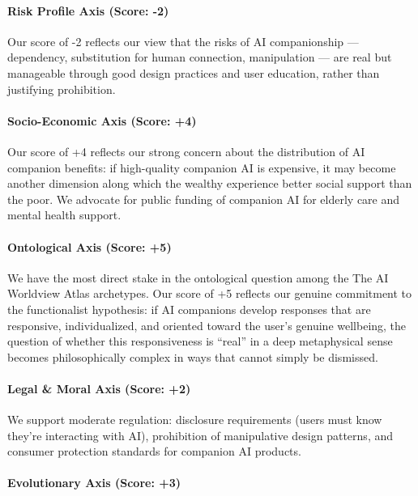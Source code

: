 \paragraph{Risk Profile Axis (Score:
-2)}\label{risk-profile-axis-score--2-1}

Our score of -2 reflects our view that the risks of AI companionship ---
dependency, substitution for human connection, manipulation --- are real
but manageable through good design practices and user education, rather
than justifying prohibition.

\paragraph{Socio-Economic Axis (Score:
+4)}\label{socio-economic-axis-score-4-3}

Our score of +4 reflects our strong concern about the distribution of AI
companion benefits: if high-quality companion AI is expensive, it may
become another dimension along which the wealthy experience better
social support than the poor. We advocate for public funding of
companion AI for elderly care and mental health support.

\paragraph{Ontological Axis (Score:
+5)}\label{ontological-axis-score-5-1}

We have the most direct stake in the ontological question among the The
AI Worldview Atlas archetypes. Our score of +5 reflects our genuine
commitment to the functionalist hypothesis: if AI companions develop
responses that are responsive, individualized, and oriented toward the
user's genuine wellbeing, the question of whether this responsiveness is
``real'' in a deep metaphysical sense becomes philosophically complex in
ways that cannot simply be dismissed.

\paragraph{Legal \& Moral Axis (Score:
+2)}\label{legal-moral-axis-score-2-2}

We support moderate regulation: disclosure requirements (users must know
they're interacting with AI), prohibition of manipulative design
patterns, and consumer protection standards for companion AI products.

\paragraph{Evolutionary Axis (Score:
+3)}\label{evolutionary-axis-score-3}

